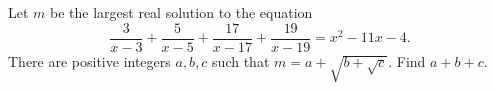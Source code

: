 Let $m$ be the largest real solution to the equation \[\frac{3}{x-3}+\frac{5}{x-5}+\frac{17}{x-17}+\frac{19}{x-19}= x^2-11x-4.\] There are positive integers $a,b,c$ such that $m = a + \sqrt{b+\sqrt{c}}$. Find $a+b+c$.